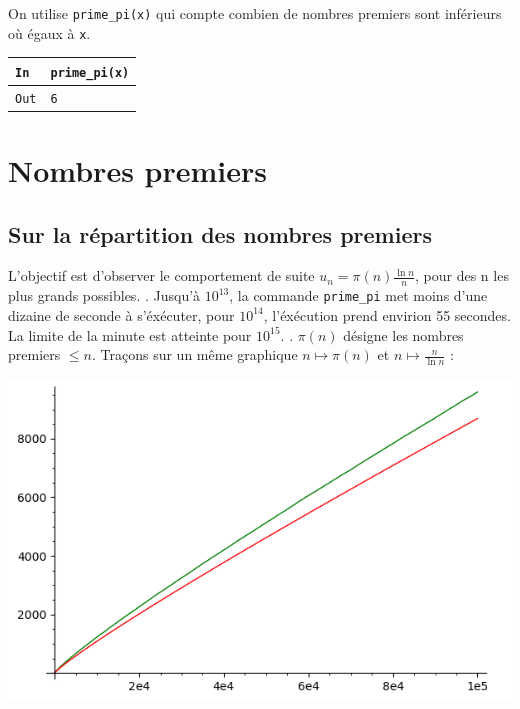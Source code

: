 \documentclass[titlepage]{article}
\begin{document}
    On utilise \texttt{prime\_pi(x)} qui compte combien de nombres premiers sont inférieurs où égaux à \texttt{x}. \bigbreak

    \begin{tabularx}{12cm}{|p{0.60cm}|X|}
        \hline
        \rowcolor{gray}
        \texttt{In}
        & 
        \texttt{prime\_pi(x)}
        \\
        \hline
        \texttt{Out}
        &
        \texttt{6}
        \\
        \hline
    \end{tabularx}
    \bigbreak

    \section{Nombres premiers}
    \subsection{Sur la répartition des nombres premiers}
    \bigbreak
    L’objectif est d’observer le comportement de suite $u_n = \pi(n)\frac{\ln n}{n}$, pour des n les plus grands possibles.
    . Jusqu'à $10^{13}$, la commande \texttt{prime\_pi} met moins d'une dizaine de seconde à s'éxécuter, pour $10^{14}$, l'éxécution prend envirion 55 secondes. La limite de la minute est atteinte pour $10^{15}$.
    . $\pi (n)$ désigne les nombres premiers $\leq n$.\newline
    Traçons sur un même graphique $n \mapsto \pi (n)$ et $n \mapsto \frac{n}{\ln n}$ :  
    \begin{center}
        \includegraphics[scale=0.5]{Ressources/2022-04-27-10:20:27-screenshot.png}
        \end{center}
\end{document}
